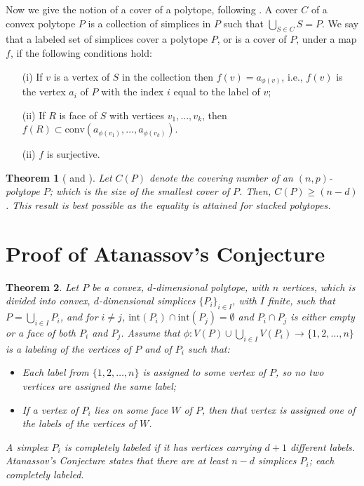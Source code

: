 \documentclass[11pt]{amsart}
\newtheorem{thm}{Theorem}[section]
\theoremstyle{definition}
\theoremstyle{remark}
\numberwithin{equation}{section}
\theoremstyle{definition}
\newcommand{\inte}{\textrm{int}}
\begin{document}
	
	Now we give the notion of a cover of a polytope, following \cite{Su2002}. A cover $C$ of a convex polytope $P$ is a collection of simplices in $P$ such that $\bigcup_{S \in C} S = P$. We say that a labeled set of simplices cover a polytope  $P$, or is a cover of $P$, under a map $f$, if the following conditions hold: 
	\begin{itemize}
		\item[(i)] If $v$ is a vertex of $S$ in the collection then $f(v)=a_{\phi(v)}$, i.e., $f(v)$ is the vertex $a_i$ of  $P$ with the index $i$ equal to the label of $v$;
		\item[(ii)] If $R$ is face of $S$  with vertices $v_1,\ldots,v_k$,  then $f(R)\subset \textrm{conv}(a_{\phi(v_1)},\ldots, a_{\phi(v_k)})$.
		\item[(ii)] $f$ is surjective.
	\end{itemize}
	
	\begin{thm}[\cite{Su2002} and \cite{Rothschild}]\label{thm:bekker2}
		Let $C(P)$ denote the covering number of an $(n,p)$-polytope $P$;
		which is the size of the smallest cover of $P$. Then, $C(P) \geq (n-d)$. This result is best possible as the equality is attained for stacked polytopes.
	\end{thm}
	
	
	\section{Proof of Atanassov's Conjecture}
	
	\begin{thm} Let $P$ be a convex, $d$-dimensional polytope, with $n$ vertices, which is divided into convex, $d$-dimensional simplices $\{P_i\}_{i\in I}$, with $I$ finite, such that $P=\bigcup_{i\in I}P_i$, and  for $i\neq j$, $\inte (P_i)\cap \inte (P_j)=\emptyset$ and $P_i\cap P_j$ is either empty or a face of both $P_i$ and $P_j$. Assume that $\phi:V(P)\cup\bigcup_{i\in I}V(P_i)\to\{1,2,\ldots,n\}$ is a labeling of the vertices of $P$ and of $P_i$ such that:
		\begin{itemize}
			\item  Each label from $\{1,2,\ldots,n\}$ is assigned to some  vertex of $P$, so  no two vertices are assigned the same label;
			\item If a vertex   of $P_i$ lies on some face $W$ of $P$, then that vertex is assigned one of the labels of  the vertices of $W$.
		\end{itemize}
		
		A simplex $P_i$ is completely labeled if it has vertices carrying $d+1$ different labels. Atanassov's Conjecture states that there are at least $n-d$ simplices $P_i$; each completely labeled.
		
	\end{thm} 
	
\end{document}
